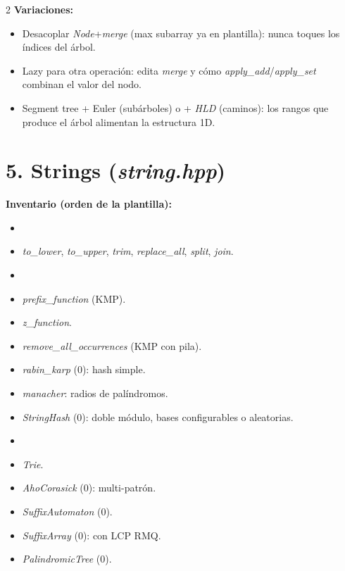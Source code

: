 \documentclass[10pt]{article}
\begin{document}
\begin{multicols}{2}
\textbf{Variaciones:}
\begin{itemize}\setlength{\itemsep}{1pt}
  \item Desacoplar \textit{Node}+\textit{merge} (max subarray ya en plantilla): nunca toques los índices del árbol.
  \item Lazy para otra operación: edita \textit{merge} y cómo \textit{apply\_add}/\textit{apply\_set} combinan el valor del nodo.
  \item Segment tree + Euler (subárboles) o + \textit{HLD} (caminos): los rangos que produce el árbol alimentan la estructura 1D.
\end{itemize}

\section*{5. Strings (\textit{string.hpp})}

\textbf{Inventario (orden de la plantilla):}
\begin{itemize}\setlength{\itemsep}{1pt}
  \item[\textbf{Utilidades}]
  \item \textit{to\_lower}, \textit{to\_upper}, \textit{trim}, \textit{replace\_all}, \textit{split}, \textit{join}.
  \item[\textbf{Patrones y hashing}]
  \item \textit{prefix\_function} (KMP).
  \item \textit{z\_function}.
  \item \textit{remove\_all\_occurrences} (KMP con pila).
  \item \textit{rabin\_karp} (0): hash simple.
  \item \textit{manacher}: radios de palíndromos.
  \item \textit{StringHash} (0): doble módulo, bases configurables o aleatorias.
  \item[\textbf{Estructuras}]
  \item \textit{Trie}.
  \item \textit{AhoCorasick} (0): multi-patrón.
  \item \textit{SuffixAutomaton} (0).
  \item \textit{SuffixArray} (0): con LCP RMQ.
  \item \textit{PalindromicTree} (0).
\end{itemize}


\end{multicols}
\end{document}

